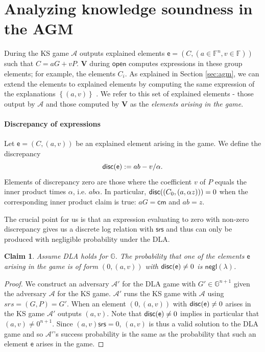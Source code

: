 \documentclass[11pt]{article} %
\newcommand{\G}{\ensuremath{{\mathbb G}}\xspace}
\newcommand{\F}{\ensuremath{\mathbb F}\xspace}
\newcommand{\adv}{\ensuremath{\mathcal A}\xspace}
\newcommand{\advprime}{\ensuremath{{\mathcal A}'}\xspace}
\newcommand{\srs}{\ensuremath{\mathsf{srs}}\xspace}
\newcommand{\cm}{\ensuremath{\mathsf{cm}}\xspace}
\newcommand{\open}{\ensuremath{\mathsf{open}}\xspace}
\newcommand{\negl}{\ensuremath{\mathsf{negl}(\lambda)}\xspace}
\newcommand{\defeq}{:=}
\newcommand{\ver}{\ensuremath{\mathsf{\mathbf{V}}}\xspace}
\newcommand{\set}[1]{\ensuremath{\left\{#1\right\}}\xspace}
\newcommand{\fn}{\ensuremath{\F^n}\xspace}
\newtheorem{claim}[lemma]{Claim}
\newcommand{\expln}{\ensuremath{\mathsf{e}}\xspace}
\begin{document}
\section{Analyzing knowledge soundness in the AGM}
During the KS game \adv outputs explained elements $\expln=(C,(a\in \fn,v\in \F))$ such that $C=aG+vP$.
\ver during \open computes expressions in these group elements; for example, the elements $C_i$.
As explained in Section \ref{sec:agm}, we can extend the elements to explained elements by computing the same expression of the explanations $\set{(a,v)}$
.
We refer to this set of explained elements - those output by \adv and those computed by \ver as the \emph{elements arising in the game}.
\paragraph{Discrepancy of expressions}
Let $\expln=(C,(a,v))$ be an explained element arising in the game.
We define the discrepancy 
\[\disc{\expln}\defeq ab-v/\alpha.\]
Elements of discrepancy zero are those where the coefficient $v$ of $ P$ equals the inner product times $\alpha$, i.e. $ab \alpha$.
In particular, $\mathsf{disc}((C_0,(a,\alpha z)))=0$ when the corresponding inner product claim is true: $aG=\cm$ and $ab=z$.


The crucial point for us is that an expression evaluating to zero with non-zero discrepancy gives us a discrete log relation with \srs
and thus can only be produced with negligible probability under the DLA.
\begin{claim}\label{clm:dlafromdisc}
 Assume DLA holds for \G.
The probability that one of the elements \expln arising in the game is of form $(0,(a,v))$ with $\disc{\expln}\neq 0$ is \negl.
\end{claim}
\begin{proof}
We construct an adversary \advprime for the DLA game with $G'\in \G^{n+1}$ given the adversary \adv for the KS game. \advprime runs the KS game with \adv using $srs=(G,P)=G'$.
When an element $(0,(a,v))$ with $\disc{\expln}\neq 0$ arises in the KS game \advprime outputs $(a,v)$.
Note that $\disc{\expln}\neq 0$ implies in particular that $(a,v)\neq 0^{n+1}$.
Since $(a,v)\srs =0$, $(a,v)$ is thus a valid solution to the DLA game and so \advprime's success probability is the same as the probability that
such an element \expln arises in the game.

\end{proof}
\end{document}

